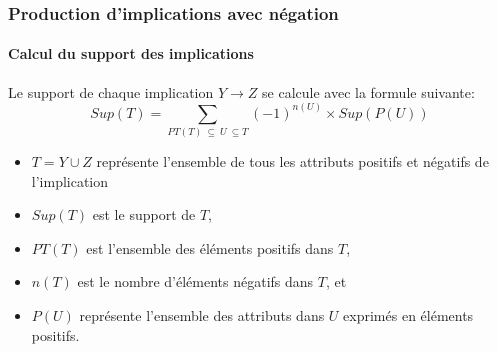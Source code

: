 \documentclass[french]{beamer}
\begin{document}
\begin{frame}
\frametitle{Production d'implications avec négation}
\framesubtitle{Calcul du support des implications}
Le support de chaque implication $ Y \rightarrow Z$ se calcule avec la formule suivante:
\begin{equation} \label{eq:support_t}
Sup(T)= \sum_{PT(T)~\subseteq~U~\subseteq T} (-1)^{n(U)}\times Sup(P(U))
\end{equation}
\begin{itemize}
\item  $T = Y\cup Z$ représente l'ensemble de tous les attributs positifs et négatifs de l'implication
\item  $Sup(T)$ est le support de $T$,
\item $PT(T)$ est l'ensemble des éléments positifs dans $T$,
\item $n(T)$ est le nombre d'éléments négatifs dans $T$, et 
\item $P(U)$ représente l'ensemble des attributs dans $U$ exprimés en éléments positifs.
\end{itemize}
\end{frame}
\end{document}
